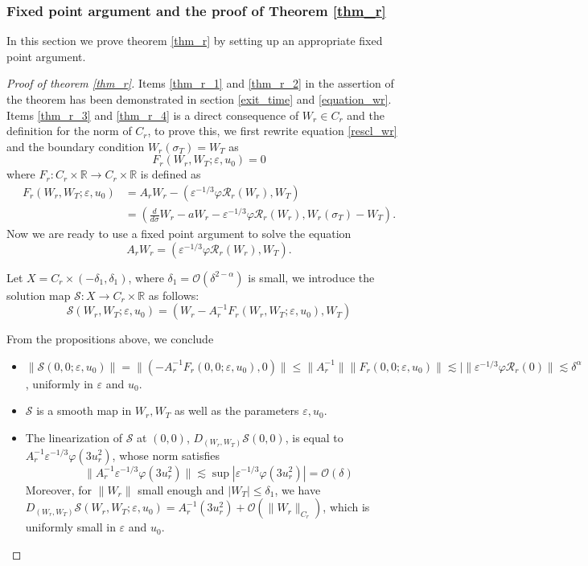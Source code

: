 \documentclass[letterpaper,11pt]{article}
\newcommand{\Ral}{\mathcal{R}}
\newcommand{\rmO}{\mathcal{O}}
\newcommand{\eps}{\varepsilon}
\newcommand{\lar}{ \lesssim }
\numberwithin{equation}{section}
\theoremstyle{plain}
\begin{document}
\subsubsection{Fixed point argument and the proof of Theorem \ref{thm_r}}
In this section we prove theorem \ref{thm_r} by setting up an appropriate fixed point argument.
\begin{proof}[Proof of theorem \ref{thm_r}]
Items \ref{thm_r_1} and \ref{thm_r_2} in the assertion of the theorem has been demonstrated in section \ref{exit_time} and \ref{equation_wr}. Items \ref{thm_r_3} and \ref{thm_r_4} is a direct consequence of $W_r \in C_r$ and the definition for the norm of $C_r$, to prove this, we first rewrite equation \eqref{rescl_wr} and the boundary condition $W_r(\sigma_T)=W_T$ as 
\[
F_r(W_r, W_T; \eps, u_0) = 0
\]
where $F_r : C_{r}\times \mathbb{R} \to C_{r}\times \mathbb{R}$ is defined as
\begin{align*}
F_r(W_r,W_T;\eps,u_0) &= A_rW_r - \left(\eps^{-1/3}\varphi \Ral_r(W_r), W_T \right)\\
&=\left( \frac{d}{d\sigma}W_r-aW_r - \eps^{-1/3}\varphi \Ral_r(W_r), W_r(\sigma_T)-W_T \right).
\end{align*} 
Now we are ready to use a fixed point argument to solve the equation 
\[
A_r W_r = (\eps^{-1/3}\varphi \mathcal{R}_r(W_r), W_T).
\]


Let $X = C_{r} \times (-\delta_1,
\delta_1)$, where $\delta_1 = \rmO(\delta^{2-\alpha})$ is small, we introduce the solution map $\mathcal{S}: X \to C_{r}\times \mathbb{R}$ as follows:
\[
\mathcal{S}(W_r,W_T; \eps, u_0) = (W_r-A_r^{-1}F_r(W_r,W_T;\eps, u_0), W_T)
\]

From the propositions above, we conclude 
\begin{itemize}
\item $\|\mathcal{S}(0,0;\eps,u_0) \|= \|\left( -A_r^{-1}F_r(0,0;\eps,u_0),0\right)\| \le \|A_r^{-1}\|\|F_r(0,0;\eps,u_0)\| \lar |\|\eps^{-1/3}\varphi \Ral_r(0)\| \lar \delta^\alpha$, uniformly in $\eps$ and $u_0$.

\item $\mathcal{S}$ is a smooth map in $W_r,W_T$ as well as the parameters $\eps, u_0$.

\item The linearization of $\mathcal{S}$ at $(0,0)$, $D_{(W_r,W_T)} \mathcal{S}(0,0)$, is equal to $A_{r}^{-1}\eps^{-1/3}\varphi(3u_r^2)$, whose norm satisfies
\[
\|A_{r}^{-1}\eps^{-1/3}\varphi(3u_r^2)\| \lar \sup|\eps^{-1/3}\varphi(3u_r^2)| = \rmO(\delta)
\]
Moreover, for $\|W_r\|$ small enough and $|W_T|\le \delta_1$, we have $D_{(W_r,W_T)}\mathcal{S}(W_r,W_T;\eps,u_0) =  A_r^{-1}(3u_r^2)+\rmO(\|W_r\|_{C_{r}})$, which is uniformly small in $\eps$ and $u_0$.


\end{itemize}
\end{proof}
\end{document}
